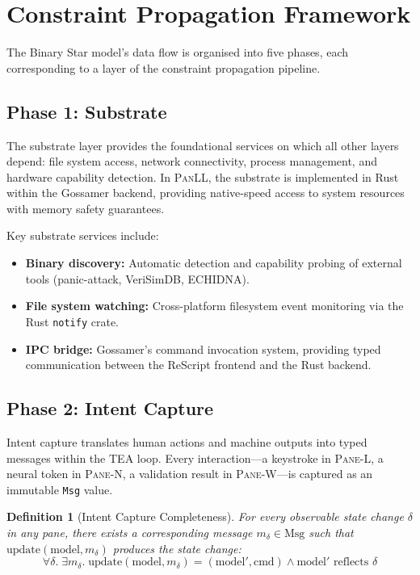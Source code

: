 \documentclass[11pt,a4paper]{article}
\newtheorem{definition}{Definition}[section]
\newcommand{\paneL}{\textsc{Pane-L}}
\newcommand{\paneN}{\textsc{Pane-N}}
\newcommand{\paneW}{\textsc{Pane-W}}
\newcommand{\panll}{\textsc{PanLL}}
\newcommand{\tea}{\textsc{TEA}}
\begin{document}
\section{Constraint Propagation Framework}\label{sec:constraint-propagation}

The Binary Star model's data flow is organised into five phases,
each corresponding to a layer of the constraint propagation
pipeline.

\subsection{Phase 1: Substrate}

The substrate layer provides the foundational services on which all
other layers depend: file system access, network connectivity,
process management, and hardware capability detection. In \panll{},
the substrate is implemented in Rust within the Gossamer backend,
providing native-speed access to system resources with memory safety
guarantees.

Key substrate services include:
\begin{itemize}
  \item \textbf{Binary discovery:} Automatic detection and capability
    probing of external tools (panic-attack, VeriSimDB, ECHIDNA).
  \item \textbf{File system watching:} Cross-platform filesystem
    event monitoring via the Rust \texttt{notify} crate.
  \item \textbf{IPC bridge:} Gossamer's command invocation system,
    providing typed communication between the ReScript frontend
    and the Rust backend.
\end{itemize}

\subsection{Phase 2: Intent Capture}

Intent capture translates human actions and machine outputs into
typed messages within the \tea{} loop. Every interaction---a
keystroke in \paneL{}, a neural token in \paneN{}, a validation
result in \paneW{}---is captured as an immutable \texttt{Msg} value.

\begin{definition}[Intent Capture Completeness]\label{def:capture}
For every observable state change $\delta$ in any pane, there exists
a corresponding message $m_\delta \in \text{Msg}$ such that
$\text{update}(\text{model}, m_\delta)$ produces the state change:
\[
  \forall \delta.\; \exists m_\delta.\;
    \text{update}(\text{model}, m_\delta) = (\text{model}', \text{cmd})
    \land \text{model}' \text{ reflects } \delta
\]
\end{definition}
\end{document}
